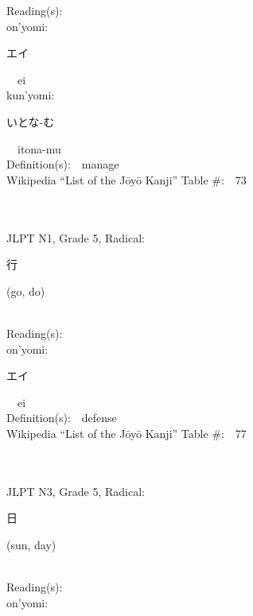 \begin{multicols}{2}
Reading(s):\ \ \\
{\hspace*{1em}}on'yomi:\ \ \\
{\hspace*{2em}}{\begin{CJK}{UTF8}{min} エイ \end{CJK}}\ \ ei\ \ \\
{\hspace*{1em}}kun'yomi:\ \ \\
{\hspace*{2em}}{\begin{CJK}{UTF8}{min} いとな-む \end{CJK}}\ \ itona-mu\ \ \\
Definition(s):\ \ manage \\
Wikipedia ``List of the J\=oy\=o Kanji'' Table \#:\ \ 73 \\
\ \ \\
{\fontsize{34pt}{40pt}  }\ \ \\  %
{JLPT N1, Grade 5, Radical:\ \ {\begin{CJK}{UTF8}{min} 行 \end{CJK}} (go, do) } \\
Reading(s):\ \ \\
{\hspace*{1em}}on'yomi:\ \ \\
{\hspace*{2em}}{\begin{CJK}{UTF8}{min} エイ \end{CJK}}\ \ ei\ \ \\
Definition(s):\ \ defense \\
Wikipedia ``List of the J\=oy\=o Kanji'' Table \#:\ \ 77 \\
\ \ \\
{\fontsize{34pt}{40pt}  }\ \ \\  %
{JLPT N3, Grade 5, Radical:\ \ {\begin{CJK}{UTF8}{min} 日 \end{CJK}} (sun, day) } \\
Reading(s):\ \ \\
{\hspace*{1em}}on'yomi:\ \ \\

\end{multicols}
